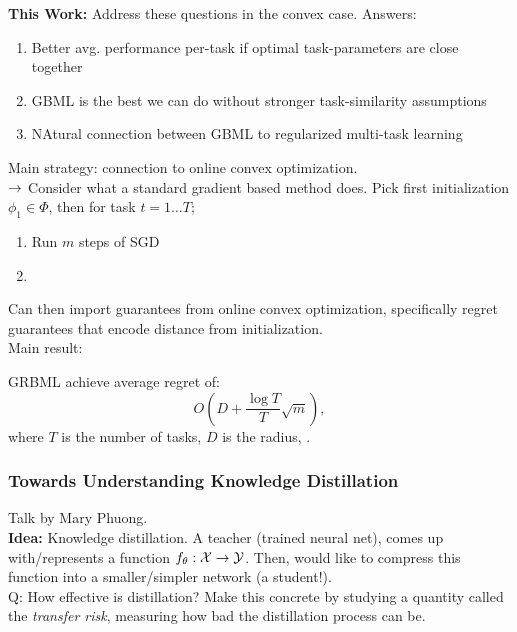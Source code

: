 {\bf This Work:} Address these questions in the convex case. Answers:

\begin{enumerate}
    \item Better avg. performance per-task if optimal task-parameters are close together
    \item GBML is the best we can do without stronger task-similarity assumptions
    \item NAtural connection between GBML to regularized multi-task learning
\end{enumerate}

Main strategy: connection to online convex optimization.\\
$\rightarrow$ Consider what a standard gradient based method does. Pick first initialization $\phi_1 \in \Phi$, then for task $t = 1 \ldots T$;
\begin{enumerate}
    \item Run $m$ steps of SGD
    \item 
\end{enumerate}
Can then import guarantees from online convex optimization, specifically regret guarantees that encode distance from initialization. \\

Main result:
\begin{theorem}
GRBML achieve average regret of:
\[
O\left(D + \frac{\log T}{T} \sqrt{m}\right),
\]
where $T$ is the number of tasks, $D$ is the radius, .
\end{theorem}

\spacerule

\subsubsection{Towards Understanding Knowledge Distillation}

Talk by Mary Phuong. \\

{\bf Idea:} Knowledge distillation. A teacher (trained neural net), comes up with/represents a function $f_\theta : \mathcal{X} \rightarrow \mathcal{Y}$. Then, would like to compress this function into a smaller/simpler network (a student!). \\

Q: How effective is distillation? Make this concrete by studying a quantity called the {\it transfer risk}, measuring how bad the distillation process can be. \\

